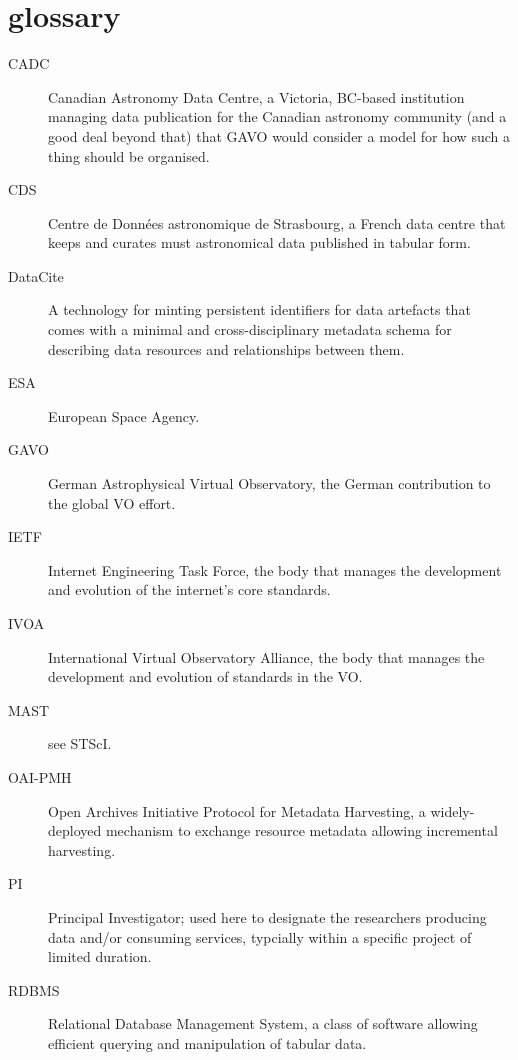 \section{glossary}
\label{app:glossary}

\begin{description}
\item[CADC] Canadian Astronomy Data Centre, a Victoria, BC-based
institution managing data publication for the Canadian astronomy
community (and a good deal beyond that) that GAVO would consider a model
for how such a thing should be organised.

\item[CDS] Centre de Donn\'ees astronomique de Strasbourg, a French data
centre that keeps and curates must astronomical data published in
tabular form.

\item[DataCite] A technology for minting persistent identifiers for data
artefacts that comes with a minimal and cross-disciplinary metadata
schema for describing data resources and relationships between them.

\item[ESA] European Space Agency.

\item[GAVO] German Astrophysical Virtual Observatory, the German
contribution to the global VO effort.

\item[IETF] Internet Engineering Task Force, the body that manages the
development and evolution of the internet's core standards.

\item[IVOA] International Virtual Observatory Alliance, the body that
manages the development and evolution of standards in the VO.

\item[MAST] see STScI.

\item[OAI-PMH] Open Archives Initiative Protocol for Metadata
Harvesting, a widely-deployed mechanism to exchange resource metadata
allowing incremental harvesting.

\item[PI] Principal Investigator; used here to designate the researchers
producing data and/or consuming services, typcially within a specific
project of limited duration.

\item[RDBMS] Relational Database Management System, a class of software
allowing efficient querying and manipulation of tabular data.


\end{description}
